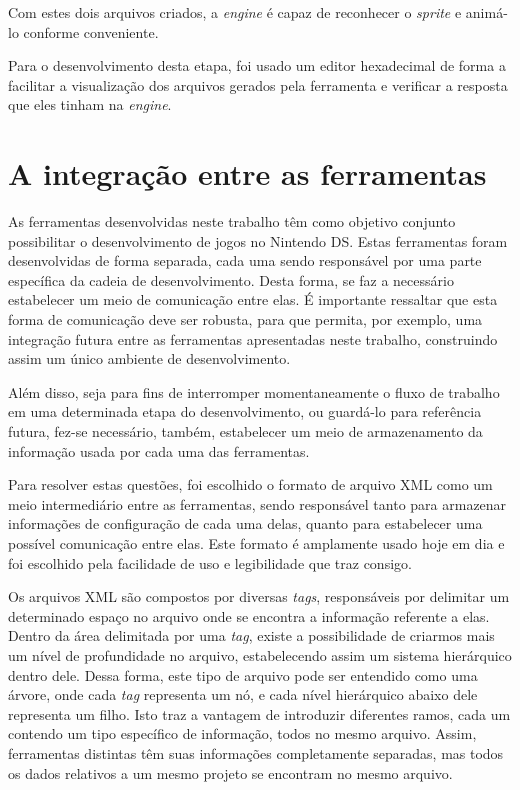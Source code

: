 \documentclass[brazil]{abnt}
\begin{document}
Com estes dois arquivos criados, a \textit{engine} é capaz de reconhecer o \textit{sprite} e animá-lo conforme conveniente.



Para o desenvolvimento desta etapa, foi usado um editor hexadecimal de forma a facilitar a visualização dos arquivos gerados pela ferramenta e verificar a resposta que eles tinham na \textit{engine}.

\section{A integração entre as ferramentas\label{sec:xml}}

As ferramentas desenvolvidas neste trabalho têm como objetivo conjunto possibilitar o desenvolvimento de jogos no Nintendo DS. Estas ferramentas foram desenvolvidas de forma separada, cada uma sendo responsável por uma parte específica da cadeia de desenvolvimento. Desta forma, se faz a necessário estabelecer um meio de comunicação entre elas. É importante ressaltar que esta forma de comunicação deve ser robusta, para que permita, por exemplo, uma integração futura entre as ferramentas apresentadas neste trabalho, construindo assim um único ambiente de desenvolvimento.

Além disso, seja para fins de interromper momentaneamente o fluxo de trabalho em uma determinada etapa do desenvolvimento, ou guardá-lo para referência futura, fez-se necessário, também, estabelecer um meio de armazenamento da informação usada por cada uma das ferramentas.

Para resolver estas questões, foi escolhido o formato de arquivo XML como um meio intermediário entre as ferramentas, sendo responsável tanto para armazenar informações de configuração de cada uma delas, quanto para estabelecer uma possível comunicação entre elas. Este formato é amplamente usado hoje em dia e foi escolhido pela facilidade de uso e legibilidade que traz consigo.

Os arquivos XML são compostos por diversas \textit{tags}, responsáveis por delimitar um determinado espaço no arquivo onde se encontra a informação referente a elas. Dentro da área delimitada por uma \textit{tag}, existe a possibilidade de criarmos mais um nível de profundidade no arquivo, estabelecendo assim um sistema hierárquico dentro dele. Dessa forma, este tipo de arquivo pode ser entendido como uma árvore, onde cada \textit{tag} representa um nó, e cada nível hierárquico abaixo dele representa um filho. Isto traz a vantagem de introduzir diferentes ramos, cada um contendo um tipo específico de informação, todos no mesmo arquivo. Assim, ferramentas distintas têm suas informações completamente separadas, mas todos os dados relativos a um mesmo projeto se encontram no mesmo arquivo.
\end{document}
